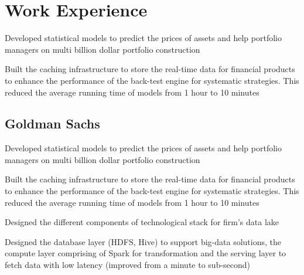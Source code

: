 \documentclass[]{resume-openfont}
\begin{document}
\begin{minipage}[t]{0.66\textwidth} 


\section{Work Experience}

\vspace{\topsep} 
\begin{tightemize}
\item Developed statistical models to predict the prices of assets and help portfolio managers on multi billion dollar portfolio construction
\item Built the caching infrastructure to store the real-time data for financial products to enhance the performance of the back-test engine for systematic strategies. This reduced the average running time of models from 1 hour to 10 minutes
\end{tightemize}


\subsection{Goldman Sachs}
\begin{tightemize}
\item Developed statistical models to predict the prices of assets and help portfolio managers on multi billion dollar portfolio construction
\item Built the caching infrastructure to store the real-time data for financial products to enhance the performance of the back-test engine for systematic strategies. This reduced the average running time of models from 1 hour to 10 minutes
\end{tightemize}

\begin{tightemize}
\item Designed the different components of technological stack for firm's data lake
\item Designed the database layer (HDFS, Hive) to support big-data solutions, the compute layer comprising of Spark for transformation and the serving layer to fetch data with low latency (improved from a minute to sub-second)
\end{tightemize}
\sectionsep


\end{minipage}
\end{document}
